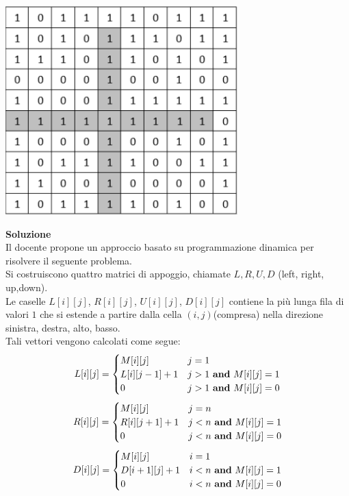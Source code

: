 \documentclass[../cheatSheetAlgoritmi.tex]{subfiles}
\begin{document}
\begin{center}
\includegraphics{../img/esame_07022019}
\end{center}
\textbf{Soluzione} \\
Il docente propone un approccio basato su programmazione dinamica per risolvere il seguente problema. \\ Si costruiscono quattro matrici di appoggio, chiamate $L,R,U,D$ (left, right, up,down). \\
Le caselle $L[i][j]$, $R[i][j]$, $U[i][j]$, $D[i][j]$ contiene la più lunga fila di valori $1$ che si estende a partire dalla cella $(i, j)$(compresa) nella direzione sinistra, destra, alto, basso. \\
Tali vettori vengono calcolati come segue: 
\begin{equation*}
  	L[i][j] =\begin{cases}
    	M[i][j] & \text{$j = 1$}\\
    	L[i][j-1] + 1 & \text{$j > 1$ \textbf{and} $M[i][j] = 1$}\\
    	0 & \text{$j > 1$ \textbf{and} $M[i][j] = 0$}
  	\end{cases}
\end{equation*}
\begin{equation*}
  	R[i][j] =\begin{cases}
    	M[i][j] & \text{$j = n$}\\
    	R[i][j+1] + 1 & \text{$j < n$ \textbf{and} $M[i][j] = 1$}\\
    	0 & \text{$j < n$ \textbf{and} $M[i][j] = 0$}
  	\end{cases}
\end{equation*}
\begin{equation*}
  	D[i][j] =\begin{cases}
    	M[i][j] & \text{$i = 1$}\\
    	D[i+1][j] + 1 & \text{$i < n$ \textbf{and} $M[i][j] = 1$}\\
    	0 & \text{$i < n$ \textbf{and} $M[i][j] = 0$}
  	\end{cases}
\end{equation*}
\end{document}
